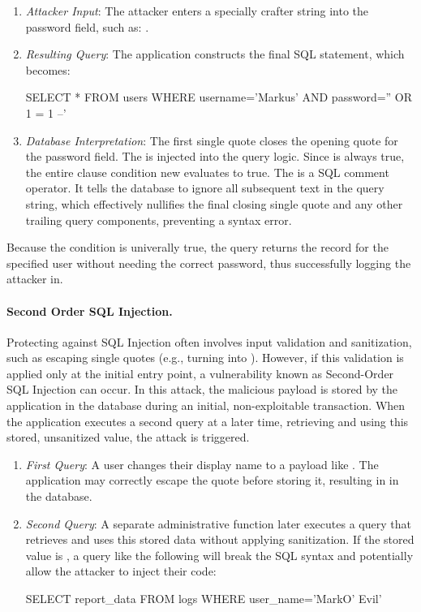 \begin{enumerate}
    \item \textit{Attacker Input}: The attacker enters a specially crafter string into the password field, such as: .
    \item \textit{Resulting Query}: The application constructs the final SQL statement, which becomes:
          \begin{sqlcode}
              SELECT * FROM users WHERE username='Markus' AND password='' OR 1 = 1 --'
          \end{sqlcode}
    \item \textit{Database Interpretation}: The first single quote closes the opening quote for the password field. The  is injected into the query logic. Since  is always true, the entire  clause condition new evaluates to true. The \NewTexttt{--} is a SQL comment operator. It tells the database to ignore all subsequent text in the query string, which effectively nullifies the final closing single quote and any other trailing query components, preventing a syntax error.
\end{enumerate}

Because the  condition is univerally true, the query returns the record for the specified user without needing the correct password, thus successfully logging the attacker in.

\paragraph{Second Order SQL Injection.} Protecting against SQL Injection often involves input validation and sanitization, such as escaping single quotes (e.g., turning  into ). However, if this validation is applied only at the initial entry point, a vulnerability known as Second-Order SQL Injection can occur. In this attack, the malicious payload is stored by the application in the database during an initial, non-exploitable transaction. When the application executes a second query at a later time, retrieving and using this stored, unsanitized value, the attack is triggered.

\begin{enumerate}
    \item \textit{First Query}: A user changes their display name to a payload like . The application may correctly escape the quote before storing it, resulting in  in the database.
    \item \textit{Second Query}: A separate administrative function later executes a query that retrieves and uses this stored data without applying sanitization. If the stored value is , a query like the following will break the SQL syntax and potentially allow the attacker to inject their code:
          \begin{sqlcode}
              SELECT report_data FROM logs WHERE user_name='MarkO' Evil'
          \end{sqlcode}
\end{enumerate}

